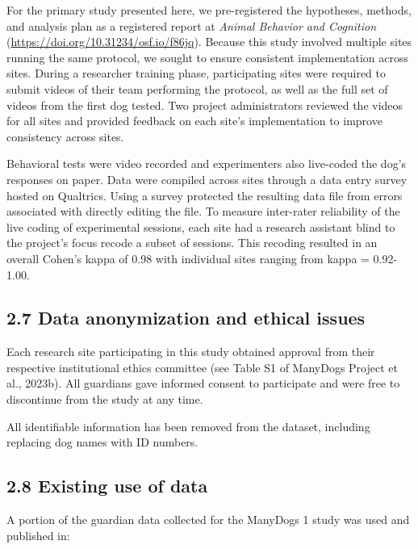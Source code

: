 \documentclass[
  pub,floatsintext]{apa6}
\begin{document}
For the primary study presented here, we pre-registered the hypotheses, methods, and analysis plan as a registered report at \emph{Animal Behavior and Cognition} (\url{https://doi.org/10.31234/osf.io/f86jq}). Because this study involved multiple sites running the same protocol, we sought to ensure consistent implementation across sites. During a researcher training phase, participating sites were required to submit videos of their team performing the protocol, as well as the full set of videos from the first dog tested. Two project administrators reviewed the videos for all sites and provided feedback on each site's implementation to improve consistency across sites.

Behavioral tests were video recorded and experimenters also live-coded the dog's responses on paper. Data were compiled across sites through a data entry survey hosted on Qualtrics. Using a survey protected the resulting data file from errors associated with directly editing the file. To measure inter-rater reliability of the live coding of experimental sessions, each site had a research assistant blind to the project's focus recode a subset of sessions. This recoding resulted in an overall Cohen's kappa of 0.98 with individual sites ranging from kappa = 0.92-1.00.

\hypertarget{data-anonymization-and-ethical-issues}{%
\subsection{2.7 Data anonymization and ethical issues}\label{data-anonymization-and-ethical-issues}}

Each research site participating in this study obtained approval from their respective institutional ethics committee (see Table S1 of ManyDogs Project et al., 2023b). All guardians gave informed consent to participate and were free to discontinue from the study at any time.

All identifiable information has been removed from the dataset, including replacing dog names with ID numbers.

\hypertarget{existing-use-of-data}{%
\subsection{2.8 Existing use of data}\label{existing-use-of-data}}

A portion of the guardian data collected for the ManyDogs 1 study was used and published in:
\end{document}

